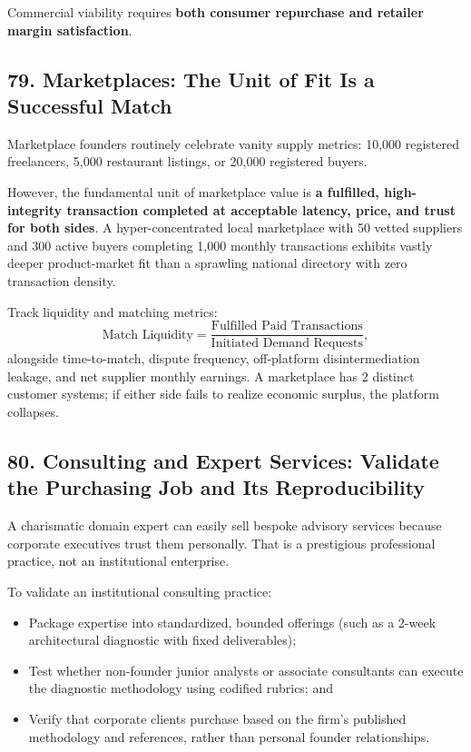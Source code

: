 Commercial viability requires \textbf{both consumer repurchase and retailer margin satisfaction}.

\subsection*{79. Marketplaces: The Unit of Fit Is a Successful Match}

Marketplace founders routinely celebrate vanity supply metrics: 10,000 registered freelancers, 5,000 restaurant listings, or 20,000 registered buyers.

However, the fundamental unit of marketplace value is \textbf{a fulfilled, high-integrity transaction completed at acceptable latency, price, and trust for both sides}. A hyper-concentrated local marketplace with 50 vetted suppliers and 300 active buyers completing 1,000 monthly transactions exhibits vastly deeper product-market fit than a sprawling national directory with zero transaction density.

Track liquidity and matching metrics:
\begin{equation}
\text{Match Liquidity} = \frac{\text{Fulfilled Paid Transactions}}{\text{Initiated Demand Requests}},
\end{equation}
alongside time-to-match, dispute frequency, off-platform disintermediation leakage, and net supplier monthly earnings. A marketplace has 2 distinct customer systems; if either side fails to realize economic surplus, the platform collapses.

\subsection*{80. Consulting and Expert Services: Validate the Purchasing Job and Its Reproducibility}

A charismatic domain expert can easily sell bespoke advisory services because corporate executives trust them personally. That is a prestigious professional practice, not an institutional enterprise.

To validate an institutional consulting practice:
\begin{itemize}
    \item Package expertise into standardized, bounded offerings (such as a 2-week architectural diagnostic with fixed deliverables);
    \item Test whether non-founder junior analysts or associate consultants can execute the diagnostic methodology using codified rubrics; and
    \item Verify that corporate clients purchase based on the firm's published methodology and references, rather than personal founder relationships.
\end{itemize}


